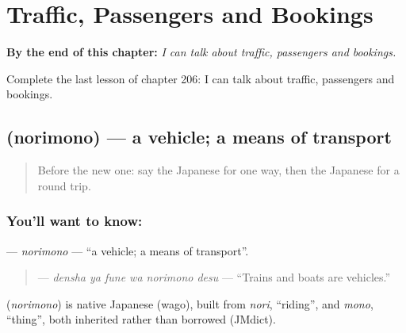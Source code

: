 
\chapter{Traffic, Passengers and Bookings}
\label{ch:ja-traffic-passengers-and-bookings}

\begin{chapteropening}
\textbf{By the end of this chapter:} \emph{I can talk about traffic, passengers and bookings.}

Complete the last lesson of chapter 206: I can talk about traffic, passengers and bookings.
\end{chapteropening}

\section[\texorpdfstring{\ja{のりもの} (norimono)}{のりもの (norimono)}]{ (norimono) — a vehicle; a means of transport}

\label{lesson:JA-C206-norimono}



\begin{quote}
Before the new one: say the Japanese for one way, then the Japanese for a round trip.
\end{quote}

\subsection*{You'll want to know: }
\textbf{} — \emph{norimono} — \textquotedblleft{}a vehicle; a means of transport\textquotedblright{}.

\begin{quote}
\textbf{  } — \emph{densha ya fune wa norimono desu} — \textquotedblleft{}Trains and boats are vehicles.\textquotedblright{}
\end{quote}

\begin{cousinweb}
\textbf{} (\emph{norimono}) is native Japanese (wago), built from \emph{nori}, \textquotedblleft{}riding\textquotedblright{}, and \emph{mono}, \textquotedblleft{}thing\textquotedblright{}, both inherited rather than borrowed (JMdict).
\end{cousinweb}

